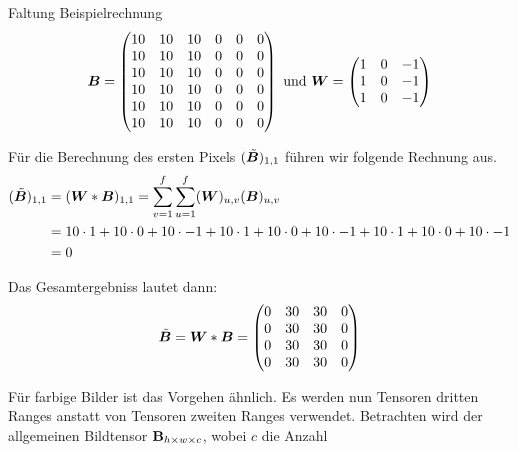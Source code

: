 \begin{examplebox}{Faltung Beispielrechnung}
  \begin{equation*}
    \bm{B} =
    \begin{pmatrix}
      10 & 10 & 10 & 0 & 0 & 0 \\
      10 & 10 & 10 & 0 & 0 & 0 \\
      10 & 10 & 10 & 0 & 0 & 0 \\
      10 & 10 & 10 & 0 & 0 & 0 \\
      10 & 10 & 10 & 0 & 0 & 0 \\
      10 & 10 & 10 & 0 & 0 & 0 \\
    \end{pmatrix}
    \text{ und } \bm{W} =
    \begin{pmatrix}
      1 & 0 & -1 \\
      1 & 0 & -1 \\
      1 & 0 & -1 \\
    \end{pmatrix}
  \end{equation*}

  Für die Berechnung des ersten Pixels $(\tilde{\bm{B}})_{1,1}$ führen wir
  folgende Rechnung aus.
  \begin{align*}
    (\tilde{\bm{B}})_{1,1} &= (\bm{W} * \bm{B})_{1,1} = \sum_{v=1}^{f} \sum_{u=1}^{f} (\bm{W})_{u,v} (\bm{B})_{u,v} \\
                            &= 10 \cdot 1 + 10 \cdot 0 + 10 \cdot -1 + 10 \cdot 1 + 10 \cdot 0 + 10 \cdot -1 + 10 \cdot 1 + 10 \cdot 0 + 10 \cdot -1 \\
                            &= 0
  \end{align*}

  Das Gesamtergebniss lautet dann:
  \begin{equation*}
    \tilde{\bm{B}} = \bm{W} * \bm{B} =
    \begin{pmatrix}
      0 & 30 & 30 & 0 \\
      0 & 30 & 30 & 0 \\
      0 & 30 & 30 & 0 \\
      0 & 30 & 30 & 0 \\
    \end{pmatrix}
  \end{equation*}
\end{examplebox}
\para{}
Für farbige Bilder ist das Vorgehen ähnlich. Es werden nun
Tensoren dritten Ranges anstatt von Tensoren zweiten Ranges verwendet.
Betrachten wird der
allgemeinen Bildtensor $\mathbf{B}_{h \times w \times c}$, wobei $c$ die Anzahl
